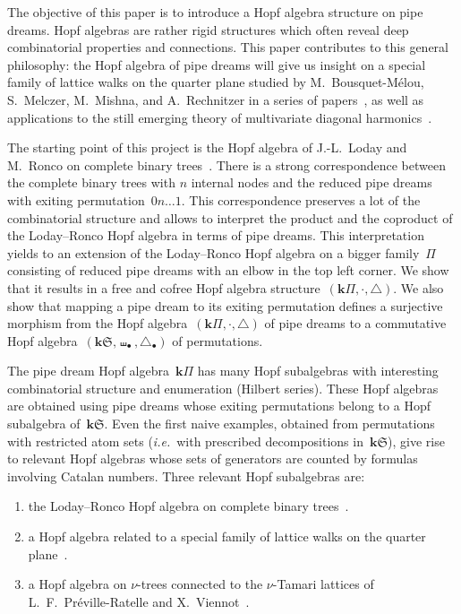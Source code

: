 \documentclass{amsart}
\theoremstyle{definition}
\newcommand{\bk}{\mathbf{k}} %
\newcommand{\ie}{\textit{i.e.}~} %
\newcommand{\fS}{\mathfrak{S}} %
\newcommand{\gdproduct}{\bullet} %
\newcommand{\gdshuffle}{\shuffle_\gdproduct} %
\newcommand{\gddeconcat}{\coproduct_\gdproduct} %
\newcommand{\HS}{{\bk\fS}} %
\newcommand{\pipeDreams}{\Pi} %
\newcommand{\HP}{{\bk\pipeDreams}} %
\newcommand{\product}{\cdot} %
\newcommand{\coproduct}{\triangle} %
\begin{document}
The objective of this paper is to introduce a Hopf algebra structure on pipe dreams.
Hopf algebras are rather rigid structures which often reveal deep combinatorial properties and connections.
This paper contributes to this general philosophy: the Hopf algebra of pipe dreams will give us insight  on a special family of lattice walks on the quarter plane studied by M.~Bousquet-M\'elou, S.~Melczer, M.~Mishna, and A.~Rechnitzer in a series of papers~\cite{BousquetMelouMishna,MishnaRechnitzer,MelczerMishna}, as well as applications to the still emerging theory of multivariate diagonal harmonics~\cite{Bergeron-multivariateDiagonalCoinvariantSpaces}.

The starting point of this project is the Hopf algebra of J.-L.~Loday and M.~Ronco on complete binary trees~\cite{LodayRonco}.
There is a strong correspondence between the complete binary trees with $n$ internal nodes and the reduced pipe dreams with exiting permutation~$0 n \dots 1$.
This correspondence preserves a lot of the combinatorial structure and allows to interpret the product and the coproduct of the Loday--Ronco Hopf algebra in terms of pipe dreams.
This interpretation yields to an extension of the Loday--Ronco Hopf algebra on a bigger family~$\pipeDreams$ consisting of reduced pipe dreams with an elbow in the top left corner.
We show that it results in a free and cofree Hopf algebra structure~$(\HP, \product, \coproduct)$.
We also show that mapping a pipe dream to its exiting permutation defines a surjective morphism from the Hopf algebra~$(\HP, \product, \coproduct)$ of pipe dreams to a commutative Hopf algebra~$(\HS, \gdshuffle, \gddeconcat)$ of permutations.

\medskip

The pipe dream Hopf algebra~$\HP$ has many Hopf subalgebras with interesting combinatorial structure and enumeration (Hilbert series).
These Hopf algebras are obtained using pipe dreams whose exiting permutations belong to a Hopf subalgebra of~$\HS$.
Even the first naive examples, obtained from permutations with restricted atom sets (\ie with prescribed decompositions in~$\HS$), give rise to relevant Hopf algebras whose sets of generators are counted by formulas involving Catalan numbers.
Three relevant Hopf subalgebras are:
\begin{enumerate}
\item the Loday--Ronco Hopf algebra on complete binary trees~\cite{LodayRonco}.
\item a Hopf algebra related to a special family of lattice walks on the quarter plane~\cite{BousquetMelouMishna, MishnaRechnitzer, MelczerMishna}.
\item a Hopf algebra on $\nu$-trees connected to the $\nu$-Tamari lattices of L.~F.~Pr\'eville-Ratelle and X.~Viennot~\cite{PrevilleRatelleViennot}.
\end{enumerate}
\end{document}
